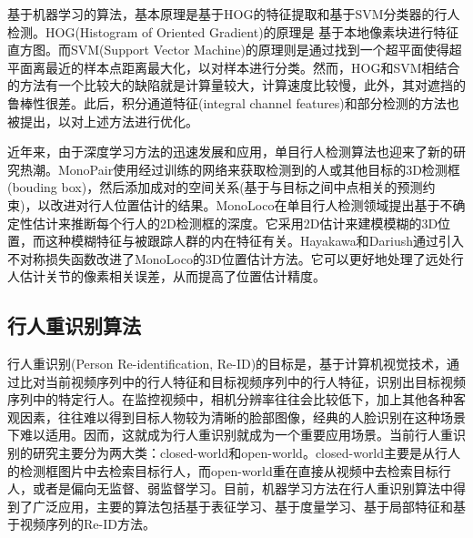 基于机器学习的算法，基本原理是基于HOG的特征提取和基于SVM分类器的行人检测。HOG(Histogram of Oriented Gradient)\cite{histograms}的原理是
基于本地像素块进行特征直方图。而SVM(Support Vector Machine)的原理则是通过找到一个超平面使得超平面离最近的样本点距离最大化，以对样本进行分类。然而，HOG和SVM相结合的方法有一个比较大的缺陷就是计算量较大，计算速度比较慢，此外，其对遮挡的鲁棒性很差。此后，积分通道特征(integral channel features)\cite{dollar2009integral}和部分检测的方法也被提出，以对上述方法进行优化。

近年来，由于深度学习方法的迅速发展和应用，单目行人检测算法也迎来了新的研究热潮。MonoPair\cite{monopair}使用经过训练的网络来获取检测到的人或其他目标的3D检测框(bouding box)，然后添加成对的空间关系(基于与目标之间中点相关的预测约束)，以改进对行人位置估计的结果。MonoLoco\cite{monoloco}在单目行人检测领域提出基于不确定性估计来推断每个行人的2D检测框的深度。它采用2D估计来建模模糊的3D位置，而这种模糊特征与被跟踪人群的内在特征有关。Hayakawa和Dariush\cite{hayakawa}通过引入不对称损失函数改进了MonoLoco的3D位置估计方法。它可以更好地处理了远处行人估计关节的像素相关误差，从而提高了位置估计精度。

\subsection{行人重识别算法}

行人重识别(Person Re-identification, Re-ID)的目标是，基于计算机视觉技术，通过比对当前视频序列中的行人特征和目标视频序列中的行人特征，识别出目标视频序列中的特定行人。在监控视频中，相机分辨率往往会比较低下，加上其他各种客观因素，往往难以得到目标人物较为清晰的脸部图像，经典的人脸识别在这种场景下难以适用。因而，这就成为行人重识别就成为一个重要应用场景。当前行人重识别的研究主要分为两大类：closed-world和open-world。closed-world主要是从行人的检测框图片中去检索目标行人，而open-world重在直接从视频中去检索目标行人，或者是偏向无监督、弱监督学习。目前，机器学习方法在行人重识别算法中得到了广泛应用，主要的算法包括基于表征学习、基于度量学习、基于局部特征和基于视频序列的Re-ID方法。

